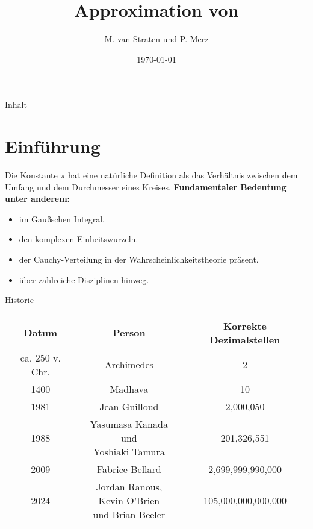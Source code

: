 \documentclass[9pt, t]{beamer}
\title{Approximation von \textpi}
\author{M. van Straten und P. Merz}
\institute{Humboldt-Universität zu Berlin \\
           Sommersemester 2024}
\date{\today}
\begin{document}
\maketitle

\begin{frame}{Inhalt}
    \tableofcontents[pausesections]
\end{frame}

\section{Einführung}

\begin{frame}
    Die Konstante \(\pi\) hat eine natürliche Definition als das Verhältnis
    zwischen dem Umfang und dem Durchmesser eines Kreises.
    \newline\newline
    \textbf{Fundamentaler Bedeutung unter anderem:}
    \begin{itemize}[<+(1)->]
        \item im Gaußschen Integral.
        \item den komplexen Einheitswurzeln.
        \item der Cauchy-Verteilung in der Wahrscheinlichkeitstheorie präsent.
        \item über zahlreiche Disziplinen hinweg.
    \end{itemize}
\end{frame}

\begin{frame}{Historie \cite{Chronology}}
    \begin{tabular}{|c||c||c|}
        \hline
        Datum       & Person                          & Korrekte Dezimalstellen \\
        \hline
        ca. 250 v.
        Chr.
                    & Archimedes                      & 2                       \\
        \hline
        1400        & Madhava                         & 10                      \\
        \hline
        1981        & Jean Guilloud                   & 2,000,050               \\
        \hline
        1988 & \shortstack{Yasumasa Kanada und                                  \\ Yoshiaki Tamura} & 201,326,551\\
        \hline
        2009  & Fabrice Bellard                       & 2,699,999,990,000       \\
        \hline
        2024  & \shortstack{Jordan Ranous,                                      \\
        Kevin O’Brien                                                           \\ und Brian Beeler} & 105,000,000,000,000\\
        \hline
    \end{tabular}
\end{frame}
\end{document}
